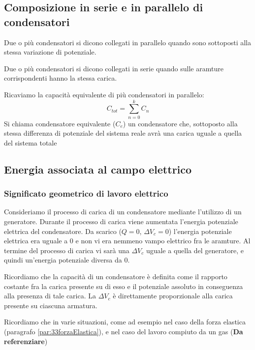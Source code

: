 \subsection{Composizione in serie e in parallelo di condensatori}
    \par Due o più condensatori si dicono collegati in parallelo quando sono sottoposti alla stessa variazione di potenziale.
    \par Due o più condensatori si dicono collegati in serie quando sulle aramture corrispondenti hanno la stessa carica.
    \par Ricaviamo la capacità equivalente di più condensatori in parallelo:
    \begin{equation*}
        C_{tot}=\sum_{n=0}^k C_n
    \end{equation*}
    Si chiama condensatore equivalente ($C_e$) un condensatore che, sottoposto alla stessa differenza di potenziale del sistema reale avrà una carica uguale a quella del sistema totale
\subsection{Energia associata al campo elettrico}
        \subsubsection{Significato geometrico di lavoro elettrico}
            \par Consideriamo il processo di carica di un condensatore mediante l'utilizzo di un generatore. Durante il processo di carica viene aumentata l'energia potenziale elettrica del condensatore. Da scarico ($Q=0$, $\Delta V_c=0$) l'energia potenziale elettrica era uguale a 0 e non vi era nemmeno vampo elettrico fra le aramture. Al termine del processo di carica vi sarà una $\Delta V_c$ uguale a quella del generatore, e quindi un'energia potenziale diversa da 0.
            \par Ricordiamo che la capacità di un condensatore è definita come  il rapporto costante fra la carica presente su di esso e il potenziale assoluto in conseguenza alla presenza di tale carica. La $\Delta V_c$ è direttamente proporzionale alla carica presente su ciascuna armatura.
            \par Ricordiamo che in varie situazioni, come ad esempio nel caso della forza elastica (paragrafo \ref{par:33forzaElastica}), e nel caso del lavoro compiuto da un gas (\large{\textbf{Da referenziare}})
